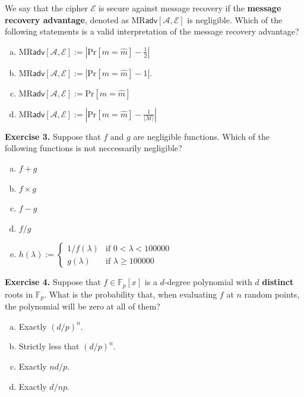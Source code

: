 \documentclass[../lecture-notes.tex]{subfiles}
\begin{document}
We say that the cipher $\mathcal{E}$ is secure against message recovery if the \textbf{message recovery advantage}, denoted as $\text{MR}\textsf{adv}[\mathcal{A}, \mathcal{E}]$ is negligible. Which of the following statements is a valid interpretation of the message recovery advantage?
\begin{enumerate}[a)]
    \item $\text{MR}\textsf{adv}[\mathcal{A},\mathcal{E}] := \left|\text{Pr}[m=\hat{m}] - \frac{1}{2}\right|$
    \item $\text{MR}\textsf{adv}[\mathcal{A},\mathcal{E}] := \left|\text{Pr}[m=\hat{m}] - 1\right|$.
    \item $\text{MR}\textsf{adv}[\mathcal{A},\mathcal{E}] := \text{Pr}[m=\hat{m}]$
    \item $\text{MR}\textsf{adv}[\mathcal{A},\mathcal{E}] := \left|\text{Pr}[m=\hat{m}] - \frac{1}{|\mathcal{M}|}\right|$
\end{enumerate}

\textbf{Exercise 3.} Suppose that $f$ and $g$ are negligible functions. Which of the following functions is not neccessarily negligible?
\begin{enumerate}[a)]
    \item $f + g$
    \item $f \times g$
    \item $f - g$
    \item $f/g$
    \item $h(\lambda) := \begin{cases}
        1/f(\lambda) & \text{if } 0 < \lambda < 100000 \\
        g(\lambda) & \text{if } \lambda \geq 100000
    \end{cases}$
\end{enumerate}

\newpage
\textbf{Exercise 4.} Suppose that $f \in \mathbb{F}_p[x]$ is a $d$-degree polynomial with $d$ \textbf{distinct} roots in $\mathbb{F}_p$. What is the probability that, when evaluating $f$ at $n$ random points, the polynomial will be zero at all of them?
\begin{multicols}{2}
    \begin{enumerate}[a)]
        \item Exactly $(d/p)^n$.
        \item Strictly less that $(d/p)^n$.
        \item Exactly $nd/p$.
        \item Exactly $d/np$.
    \end{enumerate}
\end{multicols}
\end{document}
